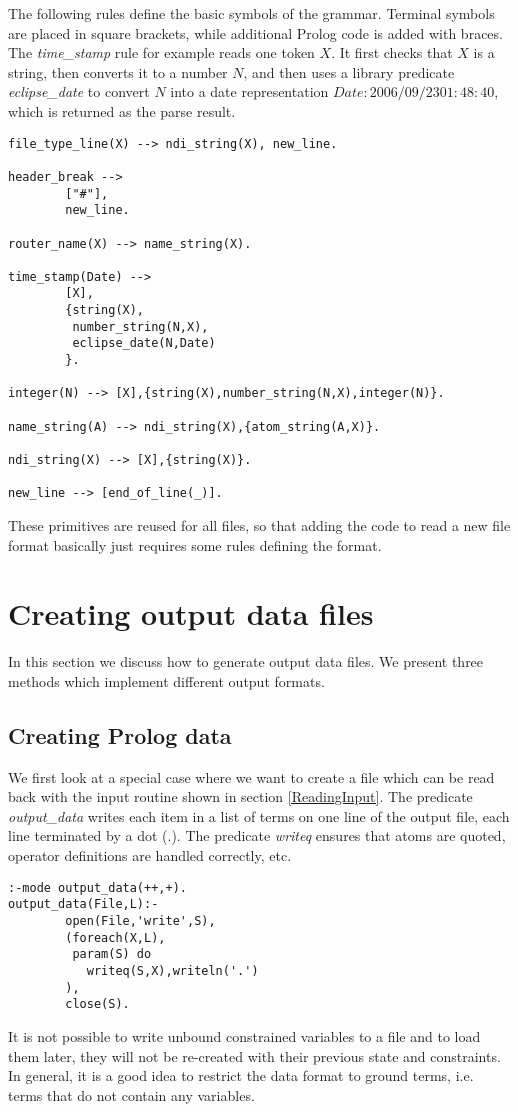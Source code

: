 \documentclass[a4paper,12pt]{report}
\begin{document}
The following rules define the basic symbols of the grammar. Terminal symbols are placed in square brackets, while additional Prolog code is added with braces. The {\it time\_stamp} rule for example reads one token $X$. It first checks that $X$ is a string, then converts it to a number $N$, and then uses a library predicate {\it eclipse\_date} to convert $N$ into a date representation $Date: 2006/09/23 01:48:40 $, which is returned as the parse result. 
\begin{verbatim}
file_type_line(X) --> ndi_string(X), new_line.

header_break --> 
        ["#"],
        new_line.

router_name(X) --> name_string(X).

time_stamp(Date) --> 
        [X],
        {string(X),
         number_string(N,X),
         eclipse_date(N,Date)
        }.

integer(N) --> [X],{string(X),number_string(N,X),integer(N)}.

name_string(A) --> ndi_string(X),{atom_string(A,X)}.

ndi_string(X) --> [X],{string(X)}.

new_line --> [end_of_line(_)].
\end{verbatim}
These primitives are reused for all files, so that adding the code to read a new file format basically just requires some rules defining the format. 

\section{Creating output data files}
In this section we discuss how to generate output data files. We present three methods which implement different output formats.

\subsection{Creating Prolog data}
We first look at a special case where we want to create a file which can be read back with the input routine shown in section \ref{ReadingInput}. The predicate {\it output\_data} writes each item in a list of terms on one line of the output file, each line terminated by a dot (.). The predicate {\it writeq} ensures that atoms are quoted, operator definitions are handled correctly, etc.
\begin{verbatim}
:-mode output_data(++,+).
output_data(File,L):-
        open(File,'write',S),
        (foreach(X,L),
         param(S) do
           writeq(S,X),writeln('.')
        ),
        close(S).
\end{verbatim}
It is not possible to write unbound constrained variables to a file and to load them later, they will not be re-created with their previous state and constraints. In general, it is a good idea to restrict the data format to ground terms, i.e. terms that do not contain any variables.
\end{document}
